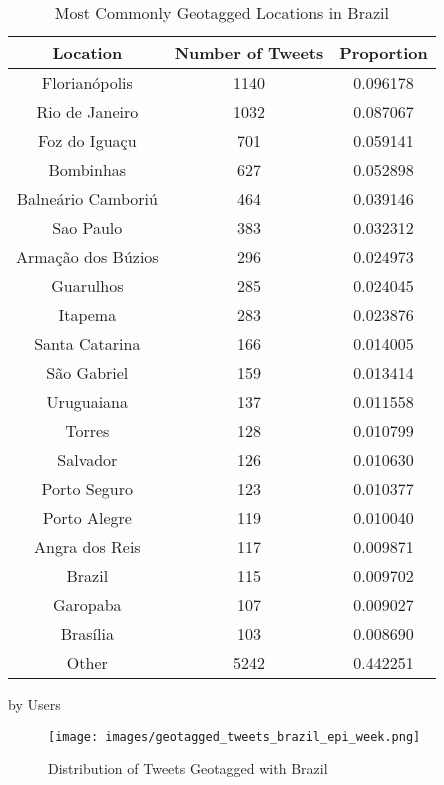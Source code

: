 \begin{table}
\begin{subtable}[c]{0.5\textwidth}
\centering
    \begin{tabular}{|c|c|c|}
    \hline
    Location & Number of Tweets & Proportion \\
    \hline
    Florianópolis & 1140 & 0.096178 \\
    Rio de Janeiro & 1032 & 0.087067 \\
    Foz do Iguaçu & 701 & 0.059141 \\
    Bombinhas & 627 & 0.052898 \\
    Balneário Camboriú & 464 & 0.039146 \\
    Sao Paulo & 383 & 0.032312 \\
    Armação dos Búzios & 296 & 0.024973 \\
    Guarulhos & 285 & 0.024045 \\
    Itapema & 283 & 0.023876 \\
    Santa Catarina & 166 & 0.014005 \\
    São Gabriel & 159 & 0.013414 \\
    Uruguaiana & 137 & 0.011558 \\
    Torres & 128 & 0.010799 \\
    Salvador & 126 & 0.010630 \\
    Porto Seguro & 123 & 0.010377 \\
    Porto Alegre & 119 & 0.010040 \\
    Angra dos Reis & 117 & 0.009871 \\
    Brazil & 115 & 0.009702 \\
    Garopaba & 107 & 0.009027 \\
    Brasília & 103 & 0.008690 \\
    Other & 5242 & 0.442251 \\
    \hline
    \end{tabular}
\caption{by Users}
\end{subtable}
\caption{Most Commonly Geotagged Locations in Brazil}
\label{table:geotagged-brazil}
\end{table}


\begin{figure}[H]
    \centering
    \texttt{[image: images/geotagged\_tweets\_brazil\_epi\_week.png]}
    
    \caption{Distribution of Tweets Geotagged with Brazil}
    \label{fig:geotagged-tweets-brazil-epi-week}
\end{figure}

\pagebreak


